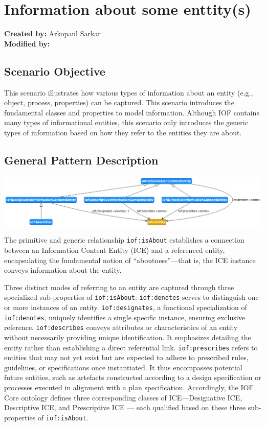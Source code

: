 \section{Information about some enttity(s)}
\label{sec-information-about}

\textbf{Created by:} Arkopaul Sarkar \\
\textbf{Modified by:}

\subsection*{Scenario Objective}
This scenario illustrates how various types of information about an entity (e.g., object, process, properties) can be captured. This scenario introduces the fundamental classes and properties to model information. Although IOF contains many types of informational entities, this scenario only introduces the generic types of information based on how they refer to the entities they are about.  

\subsection*{General Pattern Description}

\includegraphics[scale=0.35]{scenarios/information-and-aboutness/images/general-information-aboutness.png}

The primitive and generic relationship \texttt{iof:isAbout} establishes a connection between an Information Content Entity (ICE) and a referenced entity, encapsulating the fundamental notion of ``aboutness''—that is, the ICE instance conveys information about the entity.

Three distinct modes of referring to an entity are captured through three specialized sub-properties of \texttt{iof:isAbout}: \texttt{iof:denotes} serves to distinguish one or more instances of an entity.
\texttt{iof:designates}, a functional specialization of \texttt{iof:denotes}, uniquely identifies a single specific instance, ensuring exclusive reference.
\texttt{iof:describes} conveys attributes or characteristics of an entity without necessarily providing unique identification. It emphasizes detailing the entity rather than establishing a direct referential link.
\texttt{iof:prescribes} refers to entities that may not yet exist but are expected to adhere to prescribed rules, guidelines, or specifications once instantiated. It thus encompasses potential future entities, such as artefacts constructed according to a design specification or processes executed in alignment with a plan specification.
Accordingly, the IOF Core ontology defines three corresponding classes of ICE—Designative ICE, Descriptive ICE, and Prescriptive ICE — each qualified based on these three sub-properties of \texttt{iof:isAbout}. 

